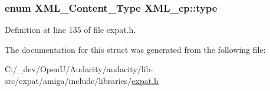\subsubsection[{\texorpdfstring{type}{type}}]{\setlength{\rightskip}{0pt plus 5cm}enum {\bf X\+M\+L\+\_\+\+Content\+\_\+\+Type} X\+M\+L\+\_\+cp\+::type}\hypertarget{struct_x_m_l__cp_a98deeadbd7d0e20387a29f9030c2a397}{}\label{struct_x_m_l__cp_a98deeadbd7d0e20387a29f9030c2a397}


Definition at line 135 of file expat.\+h.



The documentation for this struct was generated from the following file\+:\begin{DoxyCompactItemize}
\item 
C\+:/\+\_\+dev/\+Open\+U/\+Audacity/audacity/lib-\/src/expat/amiga/include/libraries/\hyperlink{amiga_2include_2libraries_2expat_8h}{expat.\+h}\end{DoxyCompactItemize}
